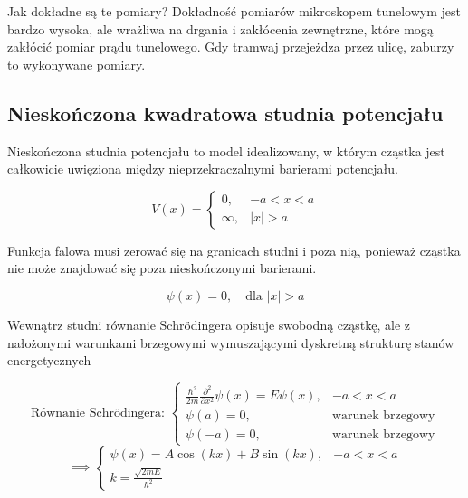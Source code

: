 Jak dokładne są te pomiary? Dokładność pomiarów mikroskopem tunelowym jest bardzo wysoka, ale wrażliwa na drgania i zakłócenia zewnętrzne,
które mogą zakłócić pomiar prądu tunelowego. Gdy tramwaj przejeżdza przez ulicę, zaburzy to wykonywane pomiary.



\subsection{Nieskończona kwadratowa studnia potencjału}

Nieskończona studnia potencjału to model idealizowany, w którym cząstka jest całkowicie uwięziona między nieprzekraczalnymi barierami potencjału.

\begin{equation*}
    V(x) = 
    \begin{cases}
        0, & -a < x < a \\
        \infty, & |x| > a
    \end{cases}
\end{equation*}

Funkcja falowa musi zerować się na granicach studni i poza nią, ponieważ cząstka nie może znajdować się poza nieskończonymi barierami.

\begin{equation*}
    \psi(x) = 0, \quad \text{dla } |x| > a
\end{equation*}

Wewnątrz studni równanie Schrödingera opisuje swobodną cząstkę, ale z nałożonymi warunkami brzegowymi
wymuszającymi dyskretną strukturę stanów energetycznych

\begin{equation*}
    \text{Równanie Schrödingera: }
    \begin{cases}
        \frac{\hbar^2}{2m} \frac{\partial^2}{\partial x^2} \psi(x) = E \psi(x), & -a < x < a \\
        \psi(a) = 0, & \text{warunek brzegowy} \\
        \psi(-a) = 0, & \text{warunek brzegowy}
    \end{cases}
\end{equation*}
%
\begin{equation*}
    \implies
    \begin{cases}
        \psi(x) = A \cos(kx) + B \sin(kx), & -a < x < a \\
        k = \frac{\sqrt{2mE}}{\hbar^2}
    \end{cases}
\end{equation*}


